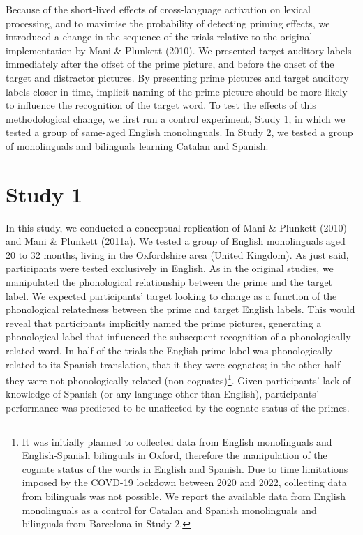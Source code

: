 \documentclass[
  12pt,
  b5paperpaper,
  twoside]{scrreprt}
\begin{document}
Because of the short-lived effects of cross-language activation on
lexical processing, and to maximise the probability of detecting priming
effects, we introduced a change in the sequence of the trials relative
to the original implementation by Mani \& Plunkett (2010). We presented
target auditory labels immediately after the offset of the prime
picture, and before the onset of the target and distractor pictures. By
presenting prime pictures and target auditory labels closer in time,
implicit naming of the prime picture should be more likely to influence
the recognition of the target word. To test the effects of this
methodological change, we first run a control experiment, Study 1, in
which we tested a group of same-aged English monolinguals. In Study 2,
we tested a group of monolinguals and bilinguals learning Catalan and
Spanish.

\hypertarget{study-1}{%
\section{Study 1}\label{study-1}}

In this study, we conducted a conceptual replication of Mani \& Plunkett
(2010) and Mani \& Plunkett (2011a). We tested a group of English
monolinguals aged 20 to 32 months, living in the Oxfordshire area
(United Kingdom). As just said, participants were tested exclusively in
English. As in the original studies, we manipulated the phonological
relationship between the prime and the target label. We expected
participants' target looking to change as a function of the phonological
relatedness between the prime and target English labels. This would
reveal that participants implicitly named the prime pictures, generating
a phonological label that influenced the subsequent recognition of a
phonologically related word. In half of the trials the English prime
label was phonologically related to its Spanish translation, that it
they were cognates; in the other half they were not phonologically
related (non-cognates)\footnote{It was initially planned to collected
  data from English monolinguals and English-Spanish bilinguals in
  Oxford, therefore the manipulation of the cognate status of the words
  in English and Spanish. Due to time limitations imposed by the COVD-19
  lockdown between 2020 and 2022, collecting data from bilinguals was
  not possible. We report the available data from English monolinguals
  as a control for Catalan and Spanish monolinguals and bilinguals from
  Barcelona in Study 2.}. Given participants' lack of knowledge of
Spanish (or any language other than English), participants' performance
was predicted to be unaffected by the cognate status of the primes.
\end{document}
